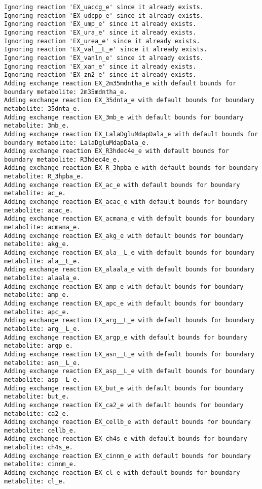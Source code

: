 \documentclass[
  letterpaper,
  DIV=11,
  numbers=noendperiod]{scrartcl}
\begin{document}
\begin{verbatim}
Ignoring reaction 'EX_uaccg_e' since it already exists.
Ignoring reaction 'EX_udcpp_e' since it already exists.
Ignoring reaction 'EX_ump_e' since it already exists.
Ignoring reaction 'EX_ura_e' since it already exists.
Ignoring reaction 'EX_urea_e' since it already exists.
Ignoring reaction 'EX_val__L_e' since it already exists.
Ignoring reaction 'EX_vanln_e' since it already exists.
Ignoring reaction 'EX_xan_e' since it already exists.
Ignoring reaction 'EX_zn2_e' since it already exists.
Adding exchange reaction EX_2m35mdntha_e with default bounds for boundary metabolite: 2m35mdntha_e.
Adding exchange reaction EX_35dnta_e with default bounds for boundary metabolite: 35dnta_e.
Adding exchange reaction EX_3mb_e with default bounds for boundary metabolite: 3mb_e.
Adding exchange reaction EX_LalaDgluMdapDala_e with default bounds for boundary metabolite: LalaDgluMdapDala_e.
Adding exchange reaction EX_R3hdec4e_e with default bounds for boundary metabolite: R3hdec4e_e.
Adding exchange reaction EX_R_3hpba_e with default bounds for boundary metabolite: R_3hpba_e.
Adding exchange reaction EX_ac_e with default bounds for boundary metabolite: ac_e.
Adding exchange reaction EX_acac_e with default bounds for boundary metabolite: acac_e.
Adding exchange reaction EX_acmana_e with default bounds for boundary metabolite: acmana_e.
Adding exchange reaction EX_akg_e with default bounds for boundary metabolite: akg_e.
Adding exchange reaction EX_ala__L_e with default bounds for boundary metabolite: ala__L_e.
Adding exchange reaction EX_alaala_e with default bounds for boundary metabolite: alaala_e.
Adding exchange reaction EX_amp_e with default bounds for boundary metabolite: amp_e.
Adding exchange reaction EX_apc_e with default bounds for boundary metabolite: apc_e.
Adding exchange reaction EX_arg__L_e with default bounds for boundary metabolite: arg__L_e.
Adding exchange reaction EX_argp_e with default bounds for boundary metabolite: argp_e.
Adding exchange reaction EX_asn__L_e with default bounds for boundary metabolite: asn__L_e.
Adding exchange reaction EX_asp__L_e with default bounds for boundary metabolite: asp__L_e.
Adding exchange reaction EX_but_e with default bounds for boundary metabolite: but_e.
Adding exchange reaction EX_ca2_e with default bounds for boundary metabolite: ca2_e.
Adding exchange reaction EX_cellb_e with default bounds for boundary metabolite: cellb_e.
Adding exchange reaction EX_ch4s_e with default bounds for boundary metabolite: ch4s_e.
Adding exchange reaction EX_cinnm_e with default bounds for boundary metabolite: cinnm_e.
Adding exchange reaction EX_cl_e with default bounds for boundary metabolite: cl_e.

\end{verbatim}
\end{document}
